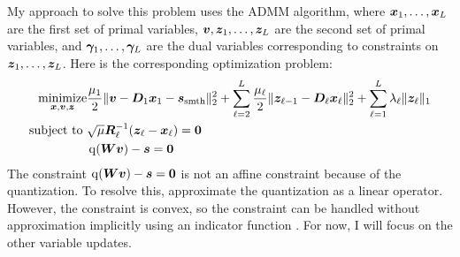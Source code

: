 My approach to solve this problem uses the ADMM algorithm, where $\bm{x}_1,\ldots,\bm{x}_L$ are the first set of primal variables, $\bm{v},\bm{z}_1,\ldots,\bm{z}_L$ are the second set of primal variables,  and $\bm{\gamma}_1,\ldots,\bm{\gamma}_L$ are the dual variables corresponding to constraints on $\bm{z}_1,\ldots,\bm{z}_L$.  Here is the corresponding optimization problem:
%
\begin{equation}
\begin{aligned}
\operatorname*{\text{minimize}}_{\bm{x},\bm{v},\bm{z}} & \frac{\mu_1}{2}\|\bm{v} - \bm{D}_1\bm{x}_1  - \bm{s}_{\text{smth}}\|_2^2 + \sum_{\ell = 2}^L \frac{\mu_{\ell}}{2}\|\bm{z}_{\ell - 1} - \bm{D}_{\ell}\bm{x}_{\ell}\|_2^2 + \sum_{\ell = 1}^L \lambda_{\ell}\|\bm{z}_{\ell}\|_1 \\
\text{subject to } & \sqrt{\mu}\bm{R}_{\ell}^{-1}(\bm{z}_{\ell} - \bm{x}_{\ell}) = \bm{0} \\
                   & \operatorname{q}(\bm{W}\bm{v}) - \bm{s} = \bm{0}
\end{aligned}
\end{equation}
%
The constraint $\operatorname{q}(\bm{W}\bm{v}) - \bm{s} = \bm{0}$ is not an affine constraint because of the quantization. To resolve this, \cite{chodosh2020use} approximate the quantization as a linear operator. However, the constraint is convex, so the constraint can be handled without approximation implicitly using an indicator function \cite{sorel2016efficient}. For now, I will focus on the other variable updates.

